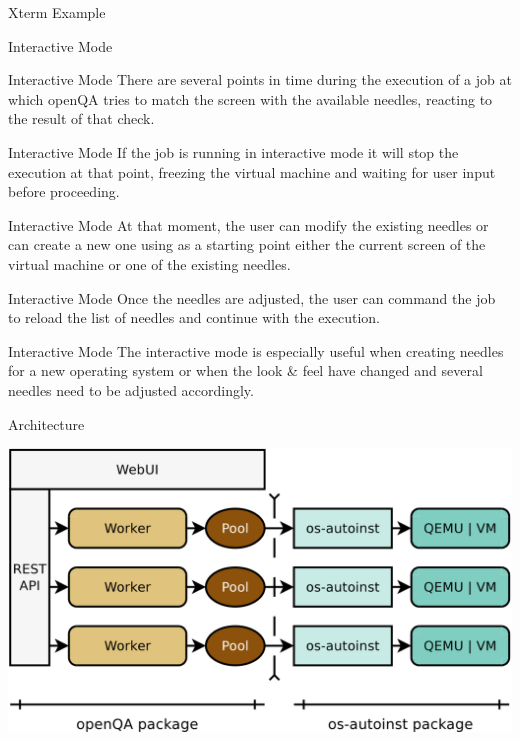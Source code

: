 \documentclass{beamer}
\begin{document}
    \begin{frame}{Xterm Example}
        
    \end{frame}

    \begin{frame}
        \center\huge Interactive Mode
    \end{frame}

    \begin{frame}{Interactive Mode}
        There are several points in time during the execution of a job at which
        openQA tries to match the screen with the available needles, reacting
        to the result of that check.
    \end{frame}

    \begin{frame}{Interactive Mode}
        If the job is running in interactive mode it will stop the execution at
        that point, freezing the virtual machine and waiting for user input
        before proceeding.
    \end{frame}

    \begin{frame}{Interactive Mode}
        At that moment, the user can modify the existing needles or can create
        a new one using as a starting point either the current screen of the
        virtual machine or one of the existing needles.
    \end{frame}

    \begin{frame}{Interactive Mode}
        Once the needles are adjusted, the user can command the job to reload
        the list of needles and continue with the execution.
    \end{frame}

    \begin{frame}{Interactive Mode}
        The interactive mode is especially useful when creating needles for a
        new operating system or when the look \& feel have changed and several
        needles need to be adjusted accordingly.
    \end{frame}

    \begin{frame}
        \center\huge Architecture
    \end{frame}

    \begin{frame}
        \includegraphics[scale=0.40]{files/arch.eps}
    \end{frame}
\end{document}
